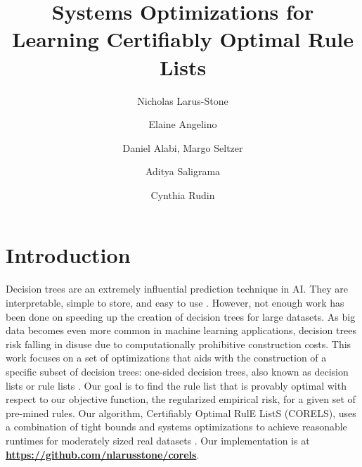 \documentclass[format=sigconf]{acmart}
\begin{document}
\title{Systems Optimizations for Learning Certifiably Optimal Rule Lists}
\author{Nicholas Larus-Stone}

\author{Elaine Angelino}

\author{Daniel Alabi, Margo Seltzer}

\author{Aditya Saligrama}

\author{Cynthia Rudin}

\setlength{\abovedisplayskip}{3pt}
\setlength{\belowdisplayskip}{-10pt}
\setlength{\textfloatsep}{8pt}

\maketitle

\section{Introduction}
Decision trees are an extremely influential prediction technique in AI.
They are interpretable, simple to store, and easy to use \cite{BreimanFrOlSt84}.
However, not enough work has been done on speeding up the creation of decision trees for large datasets.
As big data becomes even more common in machine learning applications, decision trees risk falling in disuse due to computationally prohibitive construction costs.
This work focuses on a set of optimizations that aids with the construction of a specific subset of decision trees: one-sided decision trees, also known as decision lists or rule lists \cite{Rivest87}.
Our goal is to find the rule list that is provably optimal with respect to our objective function, the regularized empirical risk, for a given set of pre-mined rules.
Our algorithm, Certifiably Optimal RulE ListS (CORELS), uses a combination of tight bounds and systems optimizations to achieve reasonable runtimes for moderately sized real datasets \citep{AngelinoLaAlSeRu17-kdd, AngelinoLaAlSeRu17}. Our implementation is at \textbf{\url{https://github.com/nlarusstone/corels}}.
\end{document}
